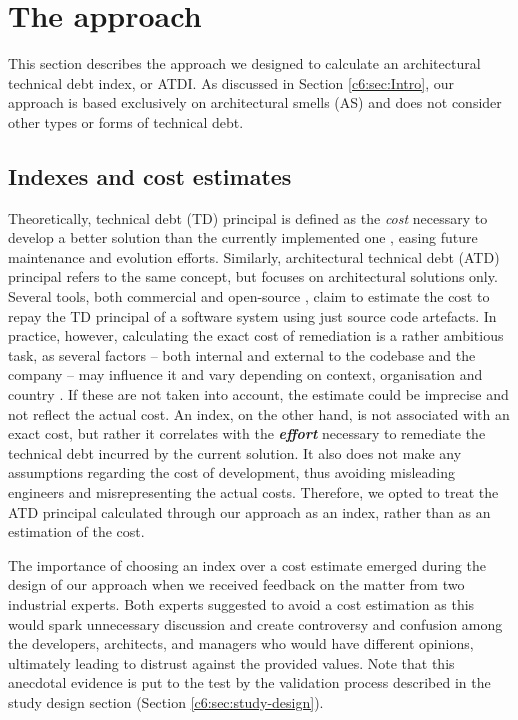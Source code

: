 \section{The approach}\label{c6:sec:approach}
This section describes the approach we designed to calculate an architectural technical debt index, or ATDI.
As discussed in Section \ref{c6:sec:Intro}, our approach is based exclusively on architectural smells (AS) and does not consider other types or forms of technical debt. 

\subsection{Indexes and cost estimates}
Theoretically, technical debt (TD) principal is defined as the \emph{cost} necessary to develop a better solution than the currently implemented one \cite{Avgeriou2016}, easing future maintenance and evolution efforts.
Similarly, architectural technical debt (ATD) principal refers to the same concept, but focuses on architectural solutions only.
Several tools, both commercial and open-source \cite{Avgeriou2021,Khomyakov2020}, claim to estimate the cost to repay the TD principal of a software system using just source code artefacts.
In practice, however, calculating the exact cost of remediation is a rather ambitious task, as several factors -- both internal and external to the codebase and the company -- may influence it and vary depending on context, organisation and country \cite{Murillo2021,Rios2020,Rios2018}.
If these are not taken into account, the estimate could be imprecise and not reflect the actual cost. 
An index, on the other hand, is not associated with an exact cost, but rather it correlates with the \textbf{\emph{effort}} necessary to remediate the technical debt incurred by the current solution.
It also does not make any assumptions regarding the cost of development, thus avoiding misleading engineers and misrepresenting the actual costs.
Therefore, we opted to treat the ATD principal calculated through our approach as an index, rather than as an estimation of the cost. 

The importance of choosing an index over a cost estimate emerged during the design of our approach when we received feedback on the matter from two industrial experts. 
Both experts suggested to avoid a cost estimation as this would spark unnecessary discussion and create controversy and confusion among the developers, architects, and managers who would have different opinions, ultimately leading to distrust against the provided values.
Note that this anecdotal evidence is put to the test by the validation process described in the study design section (Section \ref{c6:sec:study-design}).

